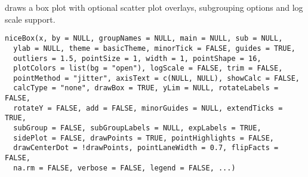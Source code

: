\documentclass[a4paper]{book}
\begin{document}
%
\begin{Examples}
\end{Examples}
%
\begin{Description}\relax
draws a box plot with optional scatter plot overlays, subgrouping options and log scale support.
\end{Description}
%
\begin{Usage}
\begin{verbatim}
niceBox(x, by = NULL, groupNames = NULL, main = NULL, sub = NULL,
  ylab = NULL, theme = basicTheme, minorTick = FALSE, guides = TRUE,
  outliers = 1.5, pointSize = 1, width = 1, pointShape = 16,
  plotColors = list(bg = "open"), logScale = FALSE, trim = FALSE,
  pointMethod = "jitter", axisText = c(NULL, NULL), showCalc = FALSE,
  calcType = "none", drawBox = TRUE, yLim = NULL, rotateLabels = FALSE,
  rotateY = FALSE, add = FALSE, minorGuides = NULL, extendTicks = TRUE,
  subGroup = FALSE, subGroupLabels = NULL, expLabels = TRUE,
  sidePlot = FALSE, drawPoints = TRUE, pointHighlights = FALSE,
  drawCenterDot = !drawPoints, pointLaneWidth = 0.7, flipFacts = FALSE,
  na.rm = FALSE, verbose = FALSE, legend = FALSE, ...)
\end{verbatim}
\end{Usage}
%
\end{document}
